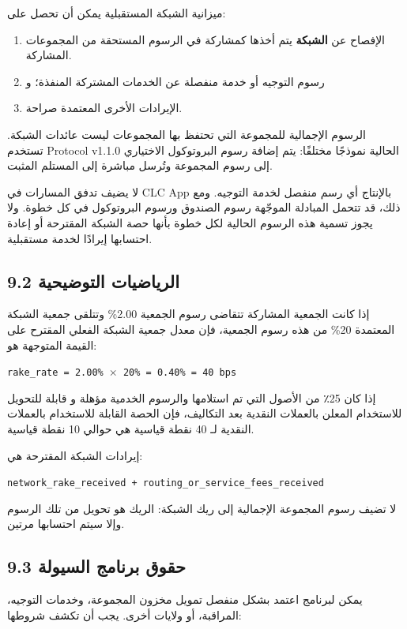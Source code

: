 \documentclass[11pt]{article}
\begin{document}
ميزانية الشبكة المستقبلية يمكن أن تحصل على:

\begin{enumerate}[leftmargin=*]
\item الإفصاح عن \textbf{الشبكة} يتم أخذها كمشاركة في الرسوم المستحقة من المجموعات المشاركة.
\item رسوم التوجيه أو خدمة منفصلة عن الخدمات المشتركة المنفذة؛ و
\item الإيرادات الأخرى المعتمدة صراحة.
\end{enumerate}
الرسوم الإجمالية للمجموعة التي تحتفظ بها المجموعات ليست عائدات الشبكة. تستخدم Protocol v1.1.0 الحالية نموذجًا مختلفًا: يتم إضافة رسوم البروتوكول الاختياري إلى رسوم المجموعة وتُرسل مباشرة إلى المستلم المثبت.

لا يضيف تدفق المسارات في CLC App بالإنتاج أي رسم منفصل لخدمة التوجيه. ومع ذلك، قد تتحمل المبادلة الموجّهة رسوم الصندوق ورسوم البروتوكول في كل خطوة. ولا يجوز تسمية هذه الرسوم الحالية لكل خطوة بأنها حصة الشبكة المقترحة أو إعادة احتسابها إيرادًا لخدمة مستقبلية.

\subsection*{9.2 الرياضيات التوضيحية}

إذا كانت الجمعية المشاركة تتقاضى رسوم الجمعية 2.00\% وتتلقى جمعية الشبكة المعتمدة 20\% من هذه رسوم الجمعية، فإن معدل جمعية الشبكة الفعلي المقترح على القيمة المتوجهة هو:

\texttt{rake\_rate = 2.00\% $\times$ 20\% = 0.40\% = 40 bps}

إذا كان 25٪ من الأصول التي تم استلامها والرسوم الخدمية مؤهلة و قابلة للتحويل للاستخدام المعلن بالعملات النقدية بعد التكاليف، فإن الحصة القابلة للاستخدام بالعملات النقدية لـ 40 نقطة قياسية هي حوالي 10 نقطة قياسية.

إيرادات الشبكة المقترحة هي:

\texttt{network\_rake\_received + routing\_or\_service\_fees\_received}

لا تضيف رسوم المجموعة الإجمالية إلى ريك الشبكة: الريك هو تحويل من تلك الرسوم وإلا سيتم احتسابها مرتين.

\subsection*{9.3 حقوق برنامج السيولة}

يمكن لبرنامج اعتمد بشكل منفصل تمويل مخزون المجموعة، وخدمات التوجيه، المراقبة، أو ولايات أخرى. يجب أن تكشف شروطها:
\end{document}
